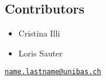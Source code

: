 \subsection{Contributors}\label{contributors}

\begin{itemize}
\tightlist
\item
  Cristina Illi
\item
  Loris Sauter
\end{itemize}

\href{mailto:name.lastname@unibas.ch}{\nolinkurl{name.lastname@unibas.ch}}
